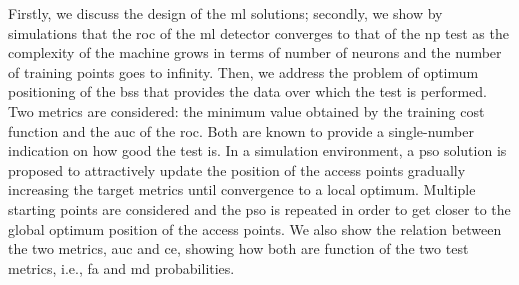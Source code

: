 \documentclass[twocolumns]{IEEEtran}
\begin{document}
Firstly, we discuss the design of the \ac{ml} solutions; secondly, we show by simulations that the \ac{roc} of the \ac{ml} detector converges to that of the \ac{np} test as the complexity of the machine grows in terms of number of neurons and the number of training points goes to infinity. Then, we address the problem of optimum positioning of the \acp{bs} that provides the data over which the test is performed. Two metrics are considered: the minimum value obtained by the training cost function and the \ac{auc} of the \ac{roc}. Both are known to provide a single-number indication on how good the test is. In a simulation environment, a \ac{pso} solution is proposed to attractively update the position of the access points gradually increasing the target metrics until convergence to a local optimum. Multiple starting points are considered and the \ac{pso} is repeated in order to get closer to the global optimum position of the access points. We also show the relation between the two metrics, \ac{auc} and \ac{ce}, showing how both are function of the two test metrics, i.e., \ac{fa} and \ac{md} probabilities.


 
\end{document}
